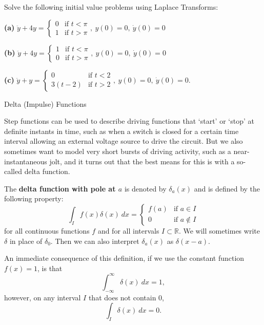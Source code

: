 {{{\begin{exe}
Solve the following initial value problems using Laplace Transforms:

{\bf (a)} $\ddot{y}+4y = \begin{cases} 0 & \mbox{if } t < \pi \\ 1 & \mbox{if } t > \pi \end{cases}, \ y(0)=0, \ \dot{y}(0)=0$

{\bf (b)} $\ddot{y}+4y = \begin{cases} 1 & \mbox{if } t < \pi \\ 0 & \mbox{if } t > \pi \end{cases}, \ y(0)=0, \ \dot{y}(0)=0$

{\bf (c)} $\ddot{y}+y = \begin{cases} 0 & \mbox{if } t < 2 \\ 3(t-2) & \mbox{if } t > 2 \end{cases}, \ y(0)=0, \ \dot{y}(0)=0$.
\end{exe}






\bigskip
\noindent
{\large {\sc Delta (Impulse) Functions}}

\bigskip
Step functions can be used to describe driving functions that `start' or `stop' at definite instants in time, such as when a switch is closed for a certain time interval allowing an external voltage source to drive the circuit.  But we also sometimes want to model very short bursts of driving activity, such as a near-instantaneous jolt, and it turns out that the best means for this is with a so-called delta function.

The 
	{\bf delta function with pole at $a$} is denoted by $\delta_a(x)$ and is defined by the following property:
\[ \int_I f(x) \delta(x) \ dx = \begin{cases} f(a) & \mbox{if } a \in I \\ 0 & \mbox{if } a \notin I \end{cases}\]
for all continuous functions $f$ and for all intervals $I \subset \mathbb{R}$.  We will sometimes write $\delta$ in place of $\delta_0$.  Then we can also interpret $\delta_a(x)$ as $\delta(x-a)$.

An immediate consequence of this definition, if we use the constant function $f(x)=1$, is that
\[\int_{-\infty}^\infty \delta(x) \ dx = 1,\]
however, on any interval $I$ that does not contain $0$,
\[ \int_I \delta(x) \ dx = 0.\]

}}}
